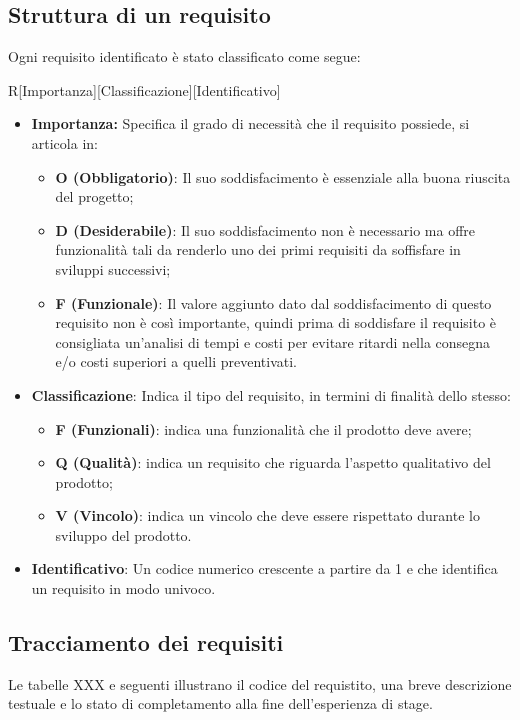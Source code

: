 \subsection{Struttura di un requisito}
Ogni requisito identificato è stato classificato come segue:
\begin{center}
	R[Importanza][Classificazione][Identificativo]
\end{center}
\begin{itemize}
	\item \textbf{Importanza:} Specifica il grado di necessità che il requisito possiede, si articola in:
	\begin{itemize}
		\item \textbf{O (Obbligatorio)}: Il suo soddisfacimento è essenziale alla buona riuscita del progetto;
		\item \textbf{D (Desiderabile)}: Il suo soddisfacimento non è necessario ma offre funzionalità tali da renderlo uno dei primi requisiti da soffisfare in sviluppi successivi;
		\item \textbf{F (Funzionale)}: Il valore aggiunto dato dal soddisfacimento di questo requisito non è così importante, quindi prima di soddisfare il requisito è consigliata un’analisi di tempi e costi per evitare ritardi nella consegna e/o costi superiori a quelli preventivati.
	\end{itemize}
	\item \textbf{Classificazione}: Indica il tipo del requisito, in termini di finalità dello stesso:
	\begin{itemize}
		\item \textbf{F (Funzionali)}: indica una funzionalità che il prodotto deve avere; 
		\item \textbf{Q (Qualità)}: indica un requisito che riguarda l'aspetto qualitativo del prodotto;
		\item \textbf{V (Vincolo)}: indica un vincolo che deve essere rispettato durante lo sviluppo del prodotto.
	\end{itemize} 
	\item \textbf{Identificativo}: Un codice numerico crescente a partire da 1 e che identifica un requisito in modo univoco. 
\end{itemize}

\subsection{Tracciamento dei requisiti}
Le tabelle XXX e seguenti illustrano il codice del requistito, una breve descrizione testuale e lo stato di completamento alla fine dell'esperienza di stage. \\


